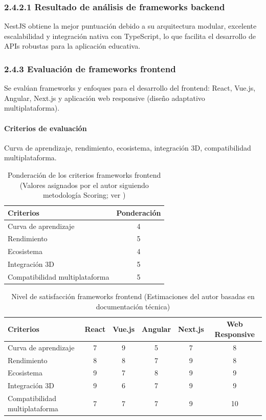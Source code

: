 \subsubsection{2.4.2.1 Resultado de análisis de frameworks backend}
NestJS obtiene la mejor puntuación debido a su arquitectura modular, excelente escalabilidad y integración nativa con TypeScript, lo que facilita el desarrollo de APIs robustas para la aplicación educativa.

\subsubsection{2.4.3 Evaluación de frameworks frontend}
Se evalúan frameworks y enfoques para el desarrollo del frontend: React, Vue.js, Angular, Next.js y aplicación web responsive (diseño adaptativo multiplataforma).

\paragraph{Criterios de evaluación}
Curva de aprendizaje, rendimiento, ecosistema, integración 3D, compatibilidad multiplataforma.
\begin{table}[ht]
\centering
\caption{Ponderación de los criterios frameworks frontend (Valores asignados por el autor siguiendo metodología Scoring; ver \cite{belton2002})}
\begin{tabular}{l c}
\hline
Criterios & Ponderación \\
\hline
Curva de aprendizaje & 4 \\
Rendimiento & 5 \\
Ecosistema & 4 \\
Integración 3D & 5 \\
Compatibilidad multiplataforma & 5 \\
\hline
\end{tabular}
\end{table}
\FloatBarrier

\begin{table}[ht]
\centering
\caption{Nivel de satisfacción frameworks frontend (Estimaciones del autor basadas en documentación técnica)}
\begin{tabular}{l c c c c c}
\hline
Criterios & React & Vue.js & Angular & Next.js & Web Responsive \\
\hline
Curva de aprendizaje & 7 & 9 & 5 & 7 & 8 \\
Rendimiento & 8 & 8 & 7 & 9 & 8 \\
Ecosistema & 9 & 7 & 8 & 9 & 9 \\
Integración 3D & 9 & 6 & 7 & 9 & 9 \\
Compatibilidad multiplataforma & 7 & 7 & 7 & 9 & 10 \\
\hline
\end{tabular}
\end{table}
\FloatBarrier

